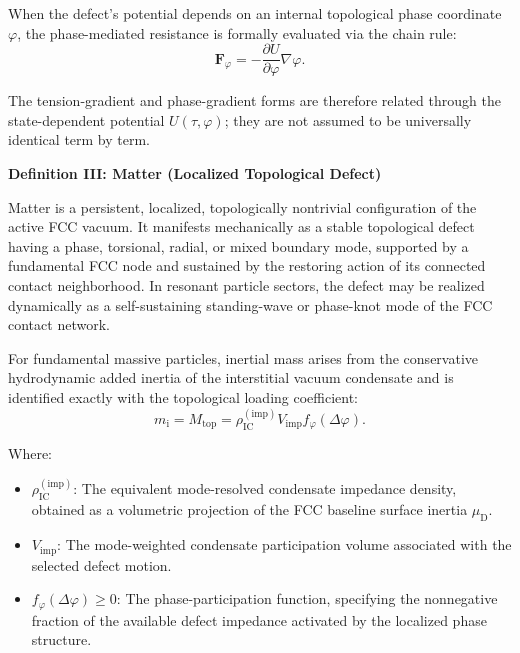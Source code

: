 When the defect's potential depends on an internal topological phase coordinate $\varphi$, the phase-mediated resistance is formally evaluated via the chain rule:
\begin{equation}
    \mathbf{F}_{\varphi} = - \frac{\partial U}{\partial\varphi} \nabla\varphi.
\end{equation}

The tension-gradient and phase-gradient forms are therefore related through the state-dependent potential $U(\tau,\varphi)$; they are not assumed to be universally identical term by term.

\vspace{0.5em}

\vspace{0.5em}
\noindent\begin{minipage}{\textwidth}
\setlength{\parindent}{1.5em} %
\label{def:definition_three}
\noindent\textbf{Definition III: Matter (Localized Topological Defect)}\vspace{0.5em}

\noindent Matter is a persistent, localized, topologically nontrivial configuration of the active FCC vacuum. It manifests mechanically as a stable topological defect having a phase, torsional, radial, or mixed boundary mode, supported by a fundamental FCC node and sustained by the restoring action of its connected contact neighborhood. In resonant particle sectors, the defect may be realized dynamically as a self-sustaining standing-wave or phase-knot mode of the FCC contact network.

For fundamental massive particles, inertial mass arises from the conservative hydrodynamic added inertia of the interstitial vacuum condensate and is identified exactly with the topological loading coefficient:
\begin{equation}
    m_{\mathrm{i}} = M_{\mathrm{top}} = \rho_{\mathrm{IC}}^{(\mathrm{imp})} V_{\mathrm{imp}} f_{\varphi}(\Delta\varphi).
\end{equation}

\noindent Where:
\begin{itemize}
    \item $\rho_{\mathrm{IC}}^{(\mathrm{imp})}$: The equivalent mode-resolved condensate impedance density, obtained as a volumetric projection of the FCC baseline surface inertia $\mu_{\mathrm{D}}$.
    \item $V_{\mathrm{imp}}$: The mode-weighted condensate participation volume associated with the selected defect motion.
    \item $f_{\varphi}(\Delta\varphi)\geq 0$: The phase-participation function, specifying the nonnegative fraction of the available defect impedance activated by the localized phase structure.
\end{itemize}


\end{minipage}
